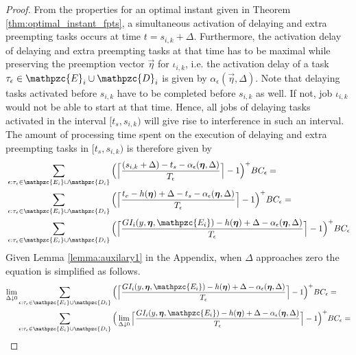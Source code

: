 \begin{proof}
	
	From the properties for an optimal instant given in Theorem \ref{thm:optimal_instant_fpts}, a simultaneous activation of delaying and extra preempting tasks occurs at time $t= s_{i,k}+\Delta$. Furthermore, the activation delay of delaying and extra preempting tasks at that time has to be maximal while preserving the preemption vector $\vec{\eta}$ for $\iota_{i,k}$, i.e. the activation delay of a task $\tau_{\epsilon}\in \mathpzc{E}_i \cup \mathpzc{D}_i$ is given by $\alpha_\epsilon(\vec{\eta},\Delta)$. Note that delaying tasks activated before $s_{i,k}$ have to be completed before $s_{i,k}$ as well. If not, job $\iota_{i,k}$ would not be able to start at that time. Hence, all jobs of delaying tasks activated in the interval $[t_s,s_{i,k})$ will give rise to interference in such an interval. The amount of processing time spent on the execution of delaying and extra preempting tasks in $[t_s,s_{i,k})$ is therefore given by
	\begin{align*}
	&\sum\limits_{\epsilon:\tau_{\epsilon} \in \mathpzc{E_i} \cup \mathpzc{D_i}} \Big( \Big\lceil  \dfrac{(s_{i,k}+\Delta)-t_s-\alpha_\epsilon(\vec{\eta},\Delta)}{T_\epsilon}\Big\rceil -1 \Big)^+  BC_\epsilon = \\
	&\sum\limits_{\epsilon:\tau_{\epsilon} \in \mathpzc{E_i} \cup \mathpzc{D_i}} \Big( \Big\lceil  \dfrac{t_e -h(\vec{\eta})+\Delta-t_s-\alpha_\epsilon(\vec{\eta},\Delta)}{T_\epsilon}\Big\rceil -1 \Big)^+  BC_\epsilon = \\
	&\sum\limits_{\epsilon:\tau_{\epsilon} \in \mathpzc{E_i} \cup \mathpzc{D_i}} \Big( \Big\lceil  \dfrac{GI_i(y, \vec{\eta},  \mathpzc{E_i})-h(\vec{\eta})+\Delta- \alpha_\epsilon(\vec{\eta},\Delta)}{T_\epsilon}\Big\rceil -1 \Big)^+  BC_\epsilon 
	\end{align*}
	Given Lemma \ref{lemma:auxilary1} in the Appendix, when $\Delta$ approaches zero the equation is simplified as follows.
	\begin{align*}
	\lim \limits_{\Delta \downarrow 0} & \sum\limits_{\epsilon:\tau_{\epsilon} \in \mathpzc{E_i} \cup \mathpzc{D_i}} \Big( \Big\lceil  \dfrac{GI_i(y, \vec{\eta},  \mathpzc{E_i})-h(\vec{\eta})+\Delta-\alpha_\epsilon(\vec{\eta},\Delta)}{T_\epsilon}\Big\rceil -1 \Big)^+  BC_\epsilon 
	= \\
	&\sum\limits_{\epsilon:\tau_{\epsilon} \in \mathpzc{E_i} \cup \mathpzc{D_i}} \Big( \lim \limits_{\Delta \downarrow 0}  \Big\lceil  \dfrac{GI_i(y, \vec{\eta},  \mathpzc{E_i})-h(\vec{\eta})+\Delta-\alpha_\epsilon(\vec{\eta},\Delta)}{T_\epsilon}\Big\rceil -1 \Big)^+  BC_\epsilon 
	= \\

\end{align*}
\end{proof}
